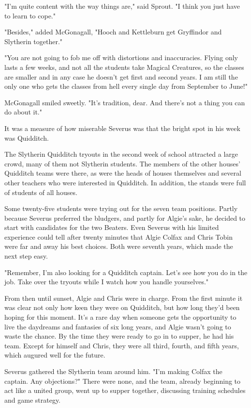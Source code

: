"I'm quite content with the way things are," said Sprout. "I think you just have to learn to cope."

"Besides," added McGonagall, "Hooch and Kettleburn get Gryffindor and Slytherin together."

"You are not going to fob me off with distortions and inaccuracies. Flying only lasts a few weeks, and not all the students take Magical Creatures, so the classes are smaller and in any case he doesn't get first and second years. I am still the only one who gets the classes from hell every single day from September to June!"

McGonagall smiled sweetly. "It's tradition, dear. And there's not a thing you can do about it."

It was a measure of how miserable Severus was that the bright spot in his week was Quidditch.

The Slytherin Quidditch tryouts in the second week of school attracted a large crowd, many of them not Slytherin students. The members of the other houses' Quidditch teams were there, as were the heads of houses themselves and several other teachers who were interested in Quidditch. In addition, the stands were full of students of all houses.

Some twenty-five students were trying out for the seven team positions. Partly because Severus preferred the bludgers, and partly for Algie's sake, he decided to start with candidates for the two Beaters. Even Severus with his limited experience could tell after twenty minutes that Algie Colfax and Chris Tobin were far and away his best choices. Both were seventh years, which made the next step easy.

"Remember, I'm also looking for a Quidditch captain. Let's see how you do in the job. Take over the tryouts while I watch how you handle yourselves."

From then until sunset, Algie and Chris were in charge. From the first minute it was clear not only how keen they were on Quidditch, but how long they'd been hoping for this moment. It's a rare day when someone gets the opportunity to live the daydreams and fantasies of six long years, and Algie wasn't going to waste the chance. By the time they were ready to go in to supper, he had his team. Except for himself and Chris, they were all third, fourth, and fifth years, which augured well for the future.

Severus gathered the Slytherin team around him. "I'm making Colfax the captain. Any objections?" There were none, and the team, already beginning to act like a united group, went up to supper together, discussing training schedules and game strategy.

